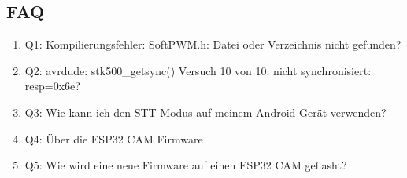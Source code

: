 \documentclass{vorlage-design-main}
\begin{document}
\hypertarget{faq}{%
\subsection{FAQ}\label{faq}}

\begin{enumerate}
\def\labelenumi{\arabic{enumi}.}

\item
  Q1: Kompilierungsfehler: SoftPWM.h: Datei oder Verzeichnis nicht
  gefunden?
\item
  Q2: avrdude: stk500\_getsync() Versuch 10 von 10: nicht
  synchronisiert: resp=0x6e?
\item
  Q3: Wie kann ich den STT-Modus auf meinem Android-Gerät verwenden?
\item
  Q4: Über die ESP32 CAM Firmware
\item
  Q5: Wie wird eine neue Firmware auf einen ESP32 CAM geflasht?
\end{enumerate} %


\clearpage
\printbibliography
\end{document}
